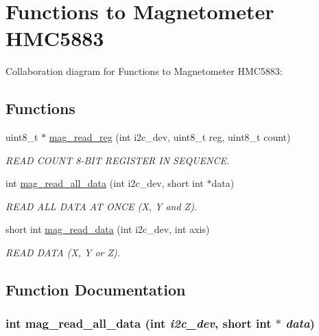 \hypertarget{group__mag}{
\section{Functions to Magnetometer HMC5883}
\label{group__mag}
}


Collaboration diagram for Functions to Magnetometer HMC5883:

\subsection*{Functions}
\begin{DoxyCompactItemize}
\item 
uint8\_\-t $\ast$ \hyperlink{group__mag_ga6830eaeae2298320e1e8c902e4edd709}{mag\_\-read\_\-reg} (int i2c\_\-dev, uint8\_\-t reg, uint8\_\-t count)
\begin{DoxyCompactList}\small\item\em READ COUNT 8-\/BIT REGISTER IN SEQUENCE. \item\end{DoxyCompactList}\item 
int \hyperlink{group__mag_gab42ae0d0a2a6f37cf36d856c072b7f34}{mag\_\-read\_\-all\_\-data} (int i2c\_\-dev, short int $\ast$data)
\begin{DoxyCompactList}\small\item\em READ ALL DATA AT ONCE (X, Y and Z). \item\end{DoxyCompactList}\item 
short int \hyperlink{group__mag_ga542a31ccd07cd2c3e8e2b68cdb6d219e}{mag\_\-read\_\-data} (int i2c\_\-dev, int axis)
\begin{DoxyCompactList}\small\item\em READ DATA (X, Y or Z). \item\end{DoxyCompactList}\end{DoxyCompactItemize}


\subsection{Function Documentation}
\hypertarget{group__mag_gab42ae0d0a2a6f37cf36d856c072b7f34}{
\subsubsection[{mag\_\-read\_\-all\_\-data}]{\setlength{\rightskip}{0pt plus 5cm}int mag\_\-read\_\-all\_\-data (int {\em i2c\_\-dev}, \/  short int $\ast$ {\em data})}}
\label{group__mag_gab42ae0d0a2a6f37cf36d856c072b7f34}


